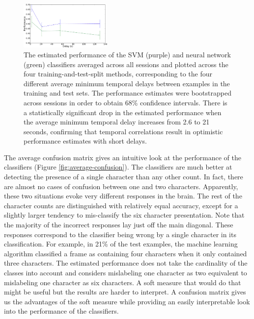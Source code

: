 \documentclass[preprint,5p,authoryear]{elsarticle}
\begin{document}
\begin{figure}
\centering
\includegraphics[width=0.4\textwidth]{figures/performance-verse-temporal-distance}
\caption{The estimated performance of the SVM (purple) and neural network (green) classifiers averaged across all sessions and plotted across the four training-and-test-split methods, corresponding to the four different average minimum temporal delays between examples in the training and test sets. 
The performance estimates were bootstrapped across sessions in order to obtain 68\% confidence intervals.
There is a statistically significant drop in the estimated performance when the average minimum temporal delay increases from 2.6 to 21 seconds, confirming that temporal correlations result in optimistic performance estimates with short delays.}
\label{fig:performance-verse-temporal-distance}
\end{figure}

The average confusion matrix gives an intuitive look at the performance of the classifiers (Figure \ref{fig:average-confusion}).
The classifiers are much better at detecting the presence of a single character than any other count.
In fact, there are almost no cases of confusion between one and two characters.
Apparently, these two situations evoke very different responses in the brain.
The rest of the character counts are distinguished with relatively equal accuracy,
except for a slightly larger tendency to mis-classify the six character presentation.
Note that the majority of the incorrect responses lay just off the main diagonal.
These responses correspond to the classifier being wrong by a single character in its classification.
For example, in 21\% of the test examples, the machine learning algorithm classified a frame as containing four characters when it only contained three characters.
The estimated performance does not take the cardinality of the classes into account and considers mislabeling one character as two equivalent to mislabeling one character as six characters.
A soft measure that would do that might be useful but the results are harder to interpret.
A confusion matrix gives us the advantages of the soft measure while providing an easily interpretable look into the performance of the classifiers.
\end{document}
